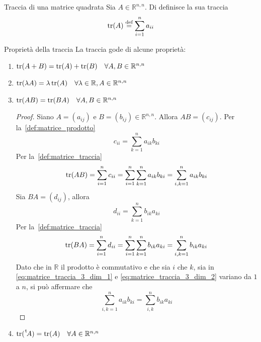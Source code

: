 \begin{Def}{Traccia di una matrice quadrata}\label{def:matrice_traccia}
  Sia $A\in\mathbb{R}^{n,n}$. Di definisce la sua traccia
  \begin{equation*}
    \tr(A)\overset{\text{def}}{=}\sum_{i=1}^{n}a_{ii}
  \end{equation*}
\end{Def}

\begin{SubDef}{Proprietà della traccia}
  La traccia gode di alcune proprietà:
  \begin{enumerate}
    \item $\tr(A+B) = \tr(A) + \tr(B)\quad\forall A,B\in\mathbb{R}^{n,n}$
    \item $\tr(\lambda A) = \lambda\tr(A)\quad\forall\lambda\in\mathbb{R},
      A\in\mathbb{R}^{n,n}$
    \item $\tr(AB) = \tr(BA)\quad\forall A,B\in\mathbb{R}^{n,n}$
      \begin{proof}
        Siano $A=(a_{ij})$ e $B=(b_{ij})\in\mathbb{R}^{n,n}$. Allora $AB=(c_{ij})$. Per
        la~\autoref{def:matrice_prodotto}
        \begin{equation*}
          c_{ii} = \sum^{n}_{k=1} a_{ik}b_{ki}
        \end{equation*}
        Per la~\autoref{def:matrice_traccia}
        \begin{equation}\label{eq:matrice_traccia_3_dim_1}
          \tr(AB) = \sum^{n}_{i=1} c_{ii}= \sum^{n}_{i=1} \sum^{n}_{k=1} a_{ik}b_{ki}=
          \sum^{n}_{i,k=1} a_{ik}b_{ki}
        \end{equation}
        Sia $BA = (d_{ij})$, allora
        \begin{equation*}
          d_{ii} = \sum^{n}_{k=1} b_{ik}a_{ki}
        \end{equation*}
        Per la~\autoref{def:matrice_traccia}
        \begin{equation}\label{eq:matrice_traccia_3_dim_2}
          \tr(BA) = \sum^{n}_{i=1} d_{ii} = \sum^{n}_{i=1} \sum^{n}_{k=1} b_{ik}a_{ki} =
          \sum^{n}_{i,k=1} b_{ik}a_{ki}
        \end{equation}
        Dato che in $\mathbb{R}$ il prodotto è commutativo e che sia $i$ che $k$, sia in
        \eqref{eq:matrice_traccia_3_dim_1} e \eqref{eq:matrice_traccia_3_dim_2} variano
        da $1$ a $n$, si può affermare che
        \begin{equation*}
          \sum^{n}_{i,k=1} a_{ik}b_{ki} = \sum^{n}_{i,k} b_{ik}a_{ki}
        \end{equation*}
      \end{proof}
    \item $\tr(\mskip1mu\prescript{\smash{\mathrm t\mkern-3mu} }{}{\mathstrut A}) = \tr(A)\quad\forall A\in\mathbb{R}^{n,n}$
  \end{enumerate}
\end{SubDef}

